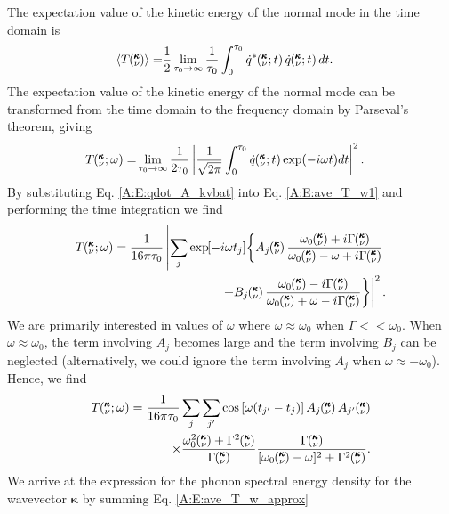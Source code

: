 The expectation value of the kinetic energy of the normal mode in the time 
domain is
\begin{equation}\label{A:E:ave_T_t}
\begin{split}
\langle T\kv \rangle=&\frac{1}{2}\lim_{\tau_0\rightarrow\infty}
\frac{1}{\tau_0}\int_{0}^{\tau_0}\dot{q}^*\kvt\dot{q}\kvt dt.
\end{split}
\end{equation}
The expectation value of the kinetic energy of the normal mode can 
be transformed from the time domain to the
frequency domain by Parseval's theorem,\cite{rudin_real_1987} giving
\begin{equation}\label{A:E:ave_T_w1}
\begin{split}
T\mspace{-4.0mu}\left(\mspace{-8.0mu} \begin{smallmatrix}&\pmb{\kappa} \\&\nu\end{smallmatrix} \mspace{-2.0mu};\omega\right)=&\lim_{\tau_0\rightarrow\infty}\frac{1}{2\tau_0}
\left|\frac{1}{\sqrt{2\pi}}\int_{0}^{\tau_0}\dot{q}\mspace{-4.0mu}\left(\mspace{-8.0mu} \begin{smallmatrix}&\pmb{\kappa} \\&\nu\end{smallmatrix} \mspace{-2.0mu};t\right)
\exp(-i\omega t)dt\right|^2.
\end{split}
\end{equation}
By substituting Eq$.$ \eqref{A:E:qdot_A_kvbat} into Eq$.$ 
\eqref{A:E:ave_T_w1} and performing the time integration we find
\begin{equation}\label{A:E:ave_T_w_int}
\begin{split}
T\kvw = \frac{1}{16\pi\tau_0}\left|\sum_j\EXP{-i\omega t_j} 
\left\{A_j\kv\frac{\omega_0\kv+i\Gamma\kv}{\omega_0\kv-\omega+i\Gamma\kv}
\right.\right.\\
\left.\left.+B_j\kv\frac{\omega_0\kv-i\Gamma\kv}
{\omega_0\kv+\omega-i\Gamma\kv}\right\}\right|^2.
\end{split}
\end{equation}
We are primarily interested in values of $\omega$ where 
$\omega\approx\omega_0$ when $\Gamma<<\omega_0$.  
When $\omega\approx\omega_0$, 
the term involving $A_j$ becomes large and the term involving $B_j$ can 
be neglected (alternatively, we could ignore the term involving $A_j$ 
when $\omega\approx-\omega_0$).  Hence, we find
\begin{equation}\label{A:E:ave_T_w_approx}
\begin{split}
T\kvw=\frac{1}{16\pi\tau_0}\sum_j\sum_{j'}\cos\left[\omega (t_{j'}-t_j)
\right]A_j\kv A_{j'}\kv\\
\times\frac{\omega_0^2\kv+\Gamma^2\kv}{\Gamma\kv}\frac{\Gamma\kv}
{[\omega_0\kv-\omega]^2+\Gamma^2\kv}.
\end{split}
\end{equation}
We arrive at the expression for the phonon spectral energy density for the 
wavevector $\pmb{\kappa}$ by summing Eq$.$ \eqref{A:E:ave_T_w_approx} 
